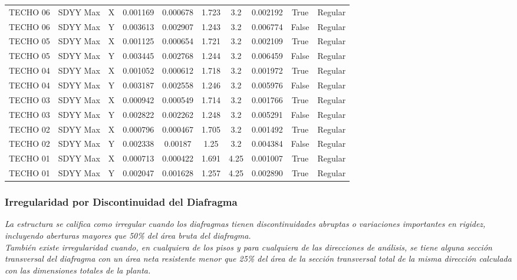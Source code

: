 \documentclass{article}%
\begin{document}
\begin{table}[ht!]
{\begin{tabular}{cccccccccc}
TECHO 06 & SDYY Max & X & 0.001169 & 0.000678 & 1.723 & 3.2 & 0.002192 & True & Regular \\
TECHO 06 & SDYY Max & Y & 0.003613 & 0.002907 & 1.243 & 3.2 & 0.006774 & False & Regular \\
TECHO 05 & SDYY Max & X & 0.001125 & 0.000654 & 1.721 & 3.2 & 0.002109 & True & Regular \\
TECHO 05 & SDYY Max & Y & 0.003445 & 0.002768 & 1.244 & 3.2 & 0.006459 & False & Regular \\
TECHO 04 & SDYY Max & X & 0.001052 & 0.000612 & 1.718 & 3.2 & 0.001972 & True & Regular \\
TECHO 04 & SDYY Max & Y & 0.003187 & 0.002558 & 1.246 & 3.2 & 0.005976 & False & Regular \\
TECHO 03 & SDYY Max & X & 0.000942 & 0.000549 & 1.714 & 3.2 & 0.001766 & True & Regular \\
TECHO 03 & SDYY Max & Y & 0.002822 & 0.002262 & 1.248 & 3.2 & 0.005291 & False & Regular \\
TECHO 02 & SDYY Max & X & 0.000796 & 0.000467 & 1.705 & 3.2 & 0.001492 & True & Regular \\
TECHO 02 & SDYY Max & Y & 0.002338 & 0.00187 & 1.25 & 3.2 & 0.004384 & False & Regular \\
TECHO 01 & SDYY Max & X & 0.000713 & 0.000422 & 1.691 & 4.25 & 0.001007 & True & Regular \\
TECHO 01 & SDYY Max & Y & 0.002047 & 0.001628 & 1.257 & 4.25 & 0.002890 & True & Regular \\
\bottomrule
\end{tabular}
}%
\end{table}

%
\subsubsection{Irregularidad por Discontinuidad del Diafragma}%
\label{ssubsec:IrregularidadporDiscontinuidaddelDiafragma}%
\begin{tcolorbox}[colback=gray!5!white,colframe=cyan!75!black,fonttitle=\bfseries,title=Tabla N°9 E-030]%
\textit{La estructura se califica como irregular cuando los diafragmas tienen discontinuidades abruptas o variaciones importantes en rigidez, incluyendo aberturas mayores que 50\% del área bruta del diafragma.} \\ \textit{También  existe  irregularidad  cuando,  en  cualquiera de  los pisos y para cualquiera de las direcciones de análisis, se tiene alguna sección transversal del diafragma con un área neta resistente menor que 25\% del área de la sección transversal total de la misma dirección calculada con las dimensiones totales de la planta.}%
\end{tcolorbox}%
\vspace{-10pt}%
\end{document}
